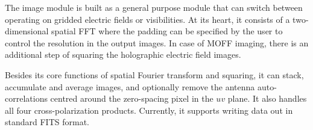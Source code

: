 \documentclass[a4paper,fleqn,usenatbib]{mnras}
\begin{document}
The image module is built as a general purpose module that can switch between 
operating on gridded electric fields or visibilities. At its heart, it consists
of a two-dimensional spatial FFT where the padding can be specified by the user 
to control the resolution in the output images. In case of MOFF imaging, there 
is an additional step of squaring the holographic electric field images. 

Besides its core functions of spatial Fourier transform and squaring, it can 
stack, accumulate and average images, and optionally remove the antenna
auto-correlations centred around the zero-spacing pixel in the $uv$ plane. 
It also handles all four cross-polarization products. Currently, it supports 
writing data out in standard FITS format. 





\bsp	%
\label{lastpage}
\end{document}
